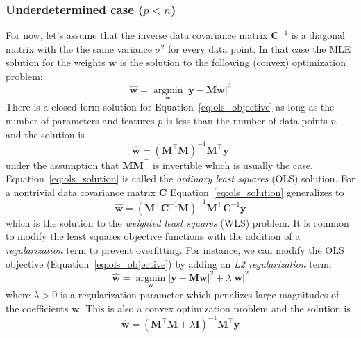 \documentclass[12pt,dvipsnames]{report}
\renewcommand{\vec}[1]{\boldsymbol{\mathbf{#1}}}
\begin{document}
\subsubsection{Underdetermined case ($p < n$)}
For now, let's assume that the inverse data covariance matrix $\vec{C}^{-1}$ is
a diagonal matrix with the the same variance $\sigma^2$ for every data point.
In that case the MLE solution for the weights $\vec{w}$ is the solution to the
following (convex) optimization problem:
\begin{equation}
    \hat{\vec{w}}=
    \underset{\boldsymbol{w}}{\operatorname{argmin}}\left|\vec{y}-\vec{M} \vec{w}\right|^{2}
    \label{eq:ols_objective}
\end{equation}
There is a closed form solution for Equation~\ref{eq:ols_objective} as long as the number
of parameters and features $p$ is less than the number of data points $n$ and the solution
is \citep{arXiv:2101.07256}
\begin{equation}
    \hat{\vec{w}}=(\vec{M}^{\intercal} \vec{M})^{-1} \vec{M}^{\intercal} \vec{y}
    \label{eq:ols_solution}
\end{equation}
under the assumption that $\vec{M}\vec{M}^\intercal$ is invertible which is usually the case.
Equation~\ref{eq:ols_solution} is called the \emph{ordinary least squares} (OLS) solution.
For a nontrivial data covariance matrix $\vec{C}$ Equation~\ref{eq:ols_solution} generalizes
to
\begin{equation}
    \hat{\vec{w}}=(\vec{M}^{\intercal}\vec{C}^{-1}\vec{M})^{-1} \vec{M}^{\intercal}\vec{C}^{-1} \vec{y}
    \label{eq:wls_solution}
\end{equation}
which is the solution to the \emph{weighted least squares} (WLS) problem.
It is common to modify the least squares objective functions with the addition of a
\emph{regularization} term to prevent overfitting. For instance, we can modify the OLS
objective (Equation~\ref{eq:ols_objective}) by adding an \emph{L2 regularization} term:
\begin{equation}
    \hat{\vec{w}}=
    \underset{\boldsymbol{w}}{\operatorname{argmin}}\left|\vec{y}-\vec{M} \vec{w}\right|^{2} + \lambda \left|\vec{w}\right|^2
    \label{eq:ols_objective_l2}
\end{equation}
where $\lambda >0$ is a regularization parameter
which penalizes large magnitudes of the coefficients $\vec{w}$. This is also a convex
optimization problem and the solution is
\begin{equation}
    \hat{\vec{w}}=(\vec{M}^{\intercal} \vec{M} + \lambda\vec{I})^{-1} \vec{M}^{\intercal} \vec{y}
    \label{eq:ols_solution_l2}
\end{equation}
\end{document}
